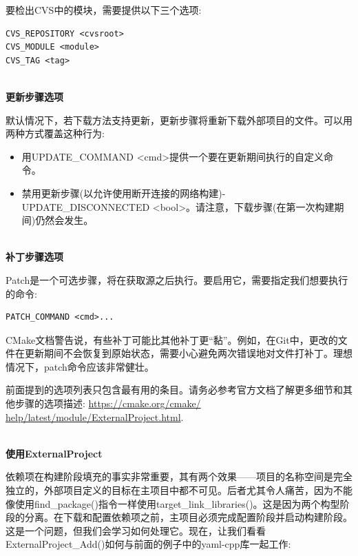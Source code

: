 要检出CVS中的模块，需要提供以下三个选项:

\begin{lstlisting}[style=styleCMake]
CVS_REPOSITORY <cvsroot>
CVS_MODULE <module>
CVS_TAG <tag>
\end{lstlisting} 

\hspace*{\fill} \\ %
\noindent
\textbf{更新步骤选项}

默认情况下，若下载方法支持更新，更新步骤将重新下载外部项目的文件。可以用两种方式覆盖这种行为:

\begin{itemize}
\item 
用UPDATE\_COMMAND <cmd>提供一个要在更新期间执行的自定义命令。

\item 
禁用更新步骤(以允许使用断开连接的网络构建)- UPDATE\_DISCONNECTED <bool>。请注意，下载步骤(在第一次构建期间)仍然会发生。
\end{itemize}

\hspace*{\fill} \\ %
\noindent
\textbf{补丁步骤选项}

Patch是一个可选步骤，将在获取源之后执行。要启用它，需要指定我们想要执行的命令:

\begin{lstlisting}[style=styleCMake]
PATCH_COMMAND <cmd>...
\end{lstlisting} 

CMake文档警告说，有些补丁可能比其他补丁更“黏”。例如，在Git中，更改的文件在更新期间不会恢复到原始状态，需要小心避免两次错误地对文件打补丁。理想情况下，patch命令应该非常健壮。

\begin{tcolorbox}[colback=blue!5!white,colframe=blue!75!black,title=重要的Note]
前面提到的选项列表只包含最有用的条目。请务必参考官方文档了解更多细节和其他步骤的选项描述: \url{https://cmake.org/cmake/ help/latest/module/ExternalProject.html}.
\end{tcolorbox}

\hspace*{\fill} \\ %
\noindent
\textbf{使用ExternalProject}

依赖项在构建阶段填充的事实非常重要，其有两个效果——项目的名称空间是完全独立的，外部项目定义的目标在主项目中都不可见。后者尤其令人痛苦，因为不能像使用find\_package()指令一样使用target\_link\_libraries()。这是因为两个构型阶段的分离。在下载和配置依赖项之前，主项目必须完成配置阶段并启动构建阶段。这是一个问题，但我们会学习如何处理它。现在，让我们看看ExternalProject\_Add()如何与前面的例子中的yaml-cpp库一起工作:

